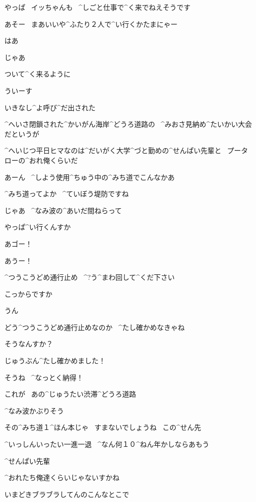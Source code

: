 \Ojisan やっぱ
\ イッちゃんも
\ ^{しごと}{仕事}で^{く}{来}でねえそうです

\Sensei あそー
\ まあいいや^{ふたり}{２人}で^{い}{行}くかたまにゃー

\Ojisan はあ

\page[115]
\Sensei じゃあ

\Sensei ついて^{く}{来}るように

\Ojisan ういーす

\Ojisan いきなし^{よ}{呼}び^{だ}{出}された

\Ojisan ^{へいさ}{閉鎖}された^{かいがん}{海岸}^{どうろ}{道路}の
\ ^{みおさ}{見納}め^{たいかい}{大会}だというが

\Ojisan ^{へいじつ}{平日}ヒマなのは^{だいがく}{大学}^{づと}{勤}めの^{せんぱい}{先輩}と
\ プータローの^{おれ}{俺}くらいだ

\page[116]
\Sensei あーん
\ ^{しよう}{使用}^{ちゅう}{中}の^{みち}{道}でこんなかあ

\Ojisan ^{みち}{道}ってよか
\ ^{ていぼう}{堤防}ですね

\page[117]
\Sensei じゃあ
\ ^{なみ}{波}の^{あいだ}{間}ねらって

\Ojisan やっぱ^{い}{行}くんすか

\Sensei あゴー！

\Ojisan あうー！

\page[118]
\Sign ^{つうこうどめ}{通行止め}
\ ^{?}{う}^{まわ}{回}して^{くだ}{下}さい

\Ojisan こっからですか

\Sensei うん

\Sensei どう^{つうこうどめ}{通行止め}なのか
\ ^{たし}{確}かめなきゃね

\Ojisan そうなんすか？

\page[119]
\Ojisan じゅうぶん^{たし}{確}かめました！

\Sensei そうね
\ ^{なっとく}{納得}！

\page[120]
\Sensei これが
\ あの^{じゅうたい}{渋滞}^{どうろ}{道路}

\Sensei ^{なみ}{波}かぶりそう

\Ojisan その^{みち}{道}１^{ほん}{本}じゃ
\ すまないでしょうね
\ この^{せん}{先}

\Sensei ^{いっしんいったい}{一進一退}
\ ^{なん}{何}１０^{ねん}{年}かしならあもう

\page[121]
\Ojisan ^{せんぱい}{先輩}

\Ojisan ^{おれたち}{俺達}くらいじゃないすかね

\Ojisan いまどきブラブラしてんのこんなとこで


